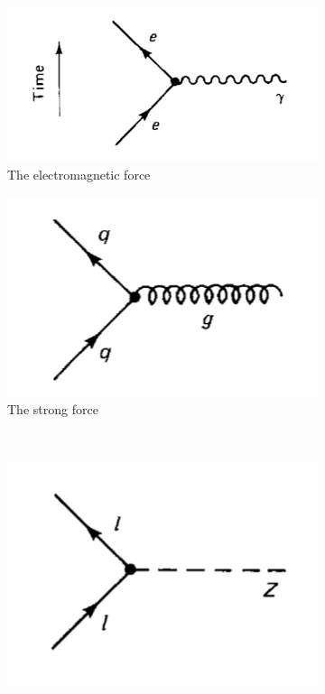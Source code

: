  \begin{figure}
     \centering
     \begin{subfigure}[b]{0.43\textwidth}
         \centering
         \includegraphics[width=\textwidth]{figures/ch1/em_force.png}
         \caption{The electromagnetic force}
     \end{subfigure}
     \hfill  
     \begin{subfigure}[b]{0.4\textwidth}
         \centering
         \includegraphics[width=\textwidth]{figures/ch1/strong_force.png}
         \caption{The strong force}
     \end{subfigure} \\
     \hfill
     \begin{subfigure}[b]{0.4\textwidth}
         \centering
         \includegraphics[width=\textwidth]{figures/ch1/weak_neutral.png}

\end{subfigure}
\end{figure}
